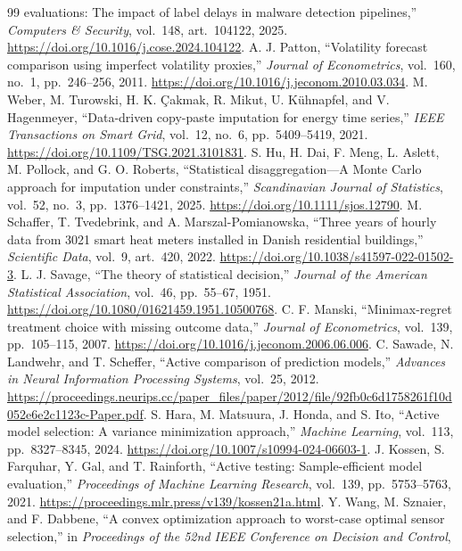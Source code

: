 \documentclass[12pt]{article}
\begin{document}
\begin{thebibliography}{99}
evaluations: The impact of label delays in malware detection pipelines,''
\emph{Computers \& Security}, vol.~148, art.~104122, 2025.
\url{https://doi.org/10.1016/j.cose.2024.104122}.
 A. J. Patton, ``Volatility forecast comparison using
imperfect volatility proxies,'' \emph{Journal of Econometrics}, vol.~160,
no.~1, pp.~246--256, 2011. \url{https://doi.org/10.1016/j.jeconom.2010.03.034}.
 M. Weber, M. Turowski, H. K. \c{C}akmak, R. Mikut,
U. K\"uhnapfel, and V. Hagenmeyer, ``Data-driven copy-paste imputation
for energy time series,'' \emph{IEEE Transactions on Smart Grid},
vol.~12, no.~6, pp.~5409--5419, 2021.
\url{https://doi.org/10.1109/TSG.2021.3101831}.
 S. Hu, H. Dai, F. Meng, L. Aslett, M. Pollock, and
G. O. Roberts, ``Statistical disaggregation---A Monte Carlo approach
for imputation under constraints,'' \emph{Scandinavian Journal of
Statistics}, vol.~52, no.~3, pp.~1376--1421, 2025.
\url{https://doi.org/10.1111/sjos.12790}.
 M. Schaffer, T. Tvedebrink, and A. Marszal-Pomianowska,
``Three years of hourly data from 3021 smart heat meters installed in
Danish residential buildings,'' \emph{Scientific Data}, vol.~9,
art.~420, 2022. \url{https://doi.org/10.1038/s41597-022-01502-3}.
 L. J. Savage, ``The theory of statistical decision,''
\emph{Journal of the American Statistical Association}, vol.~46,
pp.~55--67, 1951. \url{https://doi.org/10.1080/01621459.1951.10500768}.
 C. F. Manski, ``Minimax-regret treatment choice
with missing outcome data,'' \emph{Journal of Econometrics}, vol.~139,
pp.~105--115, 2007. \url{https://doi.org/10.1016/j.jeconom.2006.06.006}.
 C. Sawade, N. Landwehr, and T. Scheffer,
``Active comparison of prediction models,''
\emph{Advances in Neural Information Processing Systems}, vol.~25, 2012.
\url{https://proceedings.neurips.cc/paper_files/paper/2012/file/92fb0c6d1758261f10d052e6e2c1123c-Paper.pdf}.
 S. Hara, M. Matsuura, J. Honda, and S. Ito,
``Active model selection: A variance minimization approach,''
\emph{Machine Learning}, vol.~113, pp.~8327--8345, 2024.
\url{https://doi.org/10.1007/s10994-024-06603-1}.
 J. Kossen, S. Farquhar, Y. Gal, and
T. Rainforth, ``Active testing: Sample-efficient model evaluation,''
\emph{Proceedings of Machine Learning Research}, vol.~139,
pp.~5753--5763, 2021.
\url{https://proceedings.mlr.press/v139/kossen21a.html}.
 Y. Wang, M. Sznaier, and F. Dabbene,
``A convex optimization approach to worst-case optimal sensor selection,''
in \emph{Proceedings of the 52nd IEEE Conference on Decision and Control},

\end{thebibliography}
\end{document}
